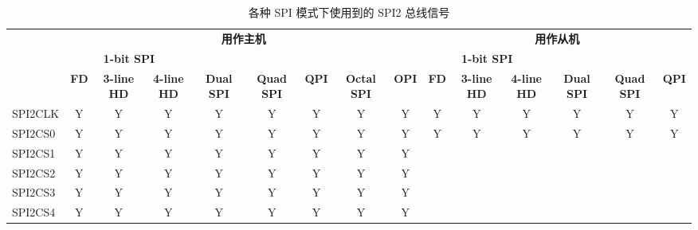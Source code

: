 \documentclass[main\_\_CN.tex]{subfiles}
\begin{document}
\begin{landscape}
\begin{table}[H]
    \centering
    \caption{各种 SPI 模式下使用到的 SPI2 总线信号}
    \label{tab:fspi-bus-singals-used-in-various-spi-modes}

    \begin{threeparttable}
    \begin{tabular}{ |p{2.0cm} |c|c|c|c|c|c|c|c|c|c|c|c|c|c| }
    \hline
        \rowcolor{lightgray}
        & \multicolumn{8}{c|}{\textbf{用作主机}} & \multicolumn{6}{c|}{\textbf{用作从机}} \\\cline{2-15}
        \rowcolor{lightgray}
        & \multicolumn{3}{c|}{\textbf{1-bit SPI}} & & & & & & \multicolumn{3}{c|}{\textbf{1-bit SPI}} & & & \\ \cline{2-4} \cline{10-12}
        \rowcolor{lightgray}
        \multirow{-3}{*}{\textbf{SPI2 总线信号}} & \textbf{FD\tnote{1}} & \textbf{3-line HD\tnote{2}} & \textbf{4-line HD} & \multirow{-2}{*}{\textbf{Dual SPI}} & \multirow{-2}{*}{\textbf{Quad SPI}} & \multirow{-2}{*}{\textbf{QPI}} & \multirow{-2}{*}{\textbf{Octal SPI}} & \multirow{-2}{*}{\textbf{OPI}} & \textbf{FD} & \textbf{3-line HD} & \textbf{4-line HD} & \multirow{-2}{*}{\textbf{Dual SPI}} & \multirow{-2}{*}{\textbf{Quad SPI}} & \multirow{-2}{*}{\textbf{QPI}} \\ \hline
SPI2CLK                  & Y       & Y       & Y       & Y       & Y       & Y      & Y       & Y      & Y       & Y      & Y       & Y       & Y       & Y      \\ \hline
SPI2CS0                  & Y       & Y       & Y       & Y       & Y       & Y      & Y       & Y      & Y       & Y      & Y       & Y       & Y       & Y      \\ \hline
SPI2CS1                  & Y       & Y       & Y       & Y       & Y       & Y      & Y       & Y      &         &        &         &         &         &        \\ \hline
SPI2CS2                  & Y       & Y       & Y       & Y       & Y       & Y      & Y       & Y      &         &        &         &         &         &        \\ \hline
SPI2CS3                  & Y       & Y       & Y       & Y       & Y       & Y      & Y       & Y      &         &        &         &         &         &        \\ \hline
SPI2CS4                  & Y       & Y       & Y       & Y       & Y       & Y      & Y       & Y      &         &        &         &         &         &        \\ \hline

\end{tabular}
\end{threeparttable}
\end{table}
\end{landscape}
\end{document}

